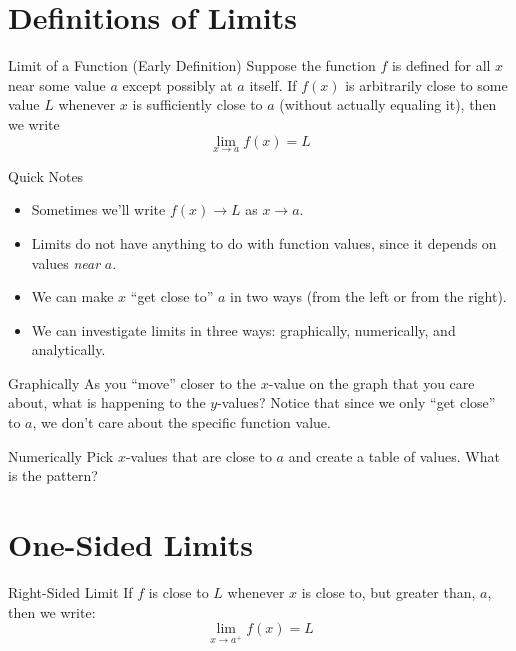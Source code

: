 \section{Definitions of Limits}

\begin{defn}{Limit of a Function (Early Definition)}
  Suppose the function $f$ is defined for all $x$ near some value $a$ except possibly at $a$ itself.
  If $f(x)$ is arbitrarily close to some value $L$ whenever $x$ is sufficiently close to $a$ (without actually equaling it), then we write
  \[\lim_{x\to a} f(x) = L\]
\end{defn}

\begin{note}{Quick Notes} \hspace{1cm}
  \begin{itemize}
    \item Sometimes we'll write $f(x) \to L$ as $x\to a$.
    \item Limits do not have anything to do with function values, since it depends on values \textit{near} $a$.
    \item We can make $x$ ``get close to'' $a$ in two ways (from the left or from the right).
    \item We can investigate limits in three ways: graphically, numerically, and analytically.
  \end{itemize}
\end{note}

\begin{defn}{Graphically}
  As you ``move'' closer to the $x$-value on the graph that you care about, what is happening to the $y$-values?
  Notice that since we only ``get close'' to $a$, we don't care about the specific function value.
\end{defn}

\begin{defn}{Numerically}
  Pick $x$-values that are close to $a$ and create a table of values.
  What is the pattern?
\end{defn}

\section*{One-Sided Limits}

\begin{defn}{Right-Sided Limit}
  If $f$ is close to $L$ whenever $x$ is close to, but greater than, $a$, then we write:
  \[ \lim_{x\to a^+} f(x)=L\]
\end{defn}

